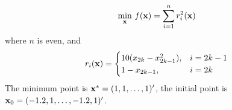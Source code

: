 \begin{example}
	\begin{equation}
		\min_{\mathbf{x}}\,f(\mathbf{x})=\sum_{i=1}^{n}r_{i}^{2}(\mathbf{x})
	\end{equation}
	where \(n\) is even, and
	\begin{equation}
		r_{i}(\mathbf{x})=\begin{cases}
			10(x_{2k}-x_{2k-1}^{2}), & i=2k-1 \\
			1-x_{2k-1},              & i=2k   \\
		\end{cases}
	\end{equation}
	The minimum point is \(\mathbf{x}^{*}=(1,1,\ldots,1)^{\prime}\), the initial point is \(\mathbf{x}_{0}=(-1.2,1,\ldots,-1.2,1)^{\prime}\).
\end{example}
